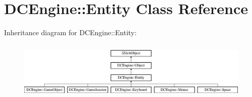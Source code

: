 \hypertarget{classDCEngine_1_1Entity}{\section{D\-C\-Engine\-:\-:Entity Class Reference}
\label{classDCEngine_1_1Entity}
}
Inheritance diagram for D\-C\-Engine\-:\-:Entity\-:\begin{figure}[H]
\begin{center}
\leavevmode
\includegraphics[height=2.817610cm]{classDCEngine_1_1Entity}
\end{center}
\end{figure}
